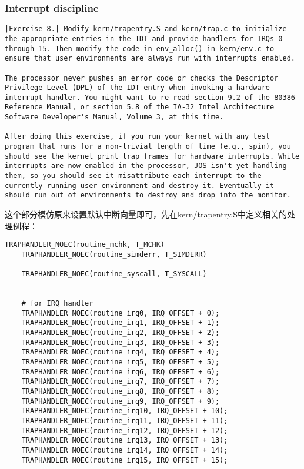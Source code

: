 \documentclass{article}
\begin{document}
\begin{CJK*}{UTF8}{gkai}
\subsubsection{Interrupt discipline}


\begin{lstlisting}[style=exercise]
|Exercise 8.| Modify kern/trapentry.S and kern/trap.c to initialize the appropriate entries in the IDT and provide handlers for IRQs 0 through 15. Then modify the code in env_alloc() in kern/env.c to ensure that user environments are always run with interrupts enabled.

The processor never pushes an error code or checks the Descriptor Privilege Level (DPL) of the IDT entry when invoking a hardware interrupt handler. You might want to re-read section 9.2 of the 80386 Reference Manual, or section 5.8 of the IA-32 Intel Architecture Software Developer's Manual, Volume 3, at this time.

After doing this exercise, if you run your kernel with any test program that runs for a non-trivial length of time (e.g., spin), you should see the kernel print trap frames for hardware interrupts. While interrupts are now enabled in the processor, JOS isn't yet handling them, so you should see it misattribute each interrupt to the currently running user environment and destroy it. Eventually it should run out of environments to destroy and drop into the monitor.
\end{lstlisting}

这个部分模仿原来设置默认中断向量即可，先在kern/trapentry.S中定义相关的处理例程：

\begin{lstlisting}[style=acode, title={\scriptsize \ttfamily \bfseries kern/trapentry.S}]
    TRAPHANDLER_NOEC(routine_mchk, T_MCHK)
    TRAPHANDLER_NOEC(routine_simderr, T_SIMDERR)

    TRAPHANDLER_NOEC(routine_syscall, T_SYSCALL)


    # for IRQ handler
    TRAPHANDLER_NOEC(routine_irq0, IRQ_OFFSET + 0);
    TRAPHANDLER_NOEC(routine_irq1, IRQ_OFFSET + 1);
    TRAPHANDLER_NOEC(routine_irq2, IRQ_OFFSET + 2);
    TRAPHANDLER_NOEC(routine_irq3, IRQ_OFFSET + 3);
    TRAPHANDLER_NOEC(routine_irq4, IRQ_OFFSET + 4);
    TRAPHANDLER_NOEC(routine_irq5, IRQ_OFFSET + 5);
    TRAPHANDLER_NOEC(routine_irq6, IRQ_OFFSET + 6);
    TRAPHANDLER_NOEC(routine_irq7, IRQ_OFFSET + 7);
    TRAPHANDLER_NOEC(routine_irq8, IRQ_OFFSET + 8);
    TRAPHANDLER_NOEC(routine_irq9, IRQ_OFFSET + 9);
    TRAPHANDLER_NOEC(routine_irq10, IRQ_OFFSET + 10);
    TRAPHANDLER_NOEC(routine_irq11, IRQ_OFFSET + 11);
    TRAPHANDLER_NOEC(routine_irq12, IRQ_OFFSET + 12);
    TRAPHANDLER_NOEC(routine_irq13, IRQ_OFFSET + 13);
    TRAPHANDLER_NOEC(routine_irq14, IRQ_OFFSET + 14);
    TRAPHANDLER_NOEC(routine_irq15, IRQ_OFFSET + 15);


\end{lstlisting}
\end{CJK*}
\end{document}
